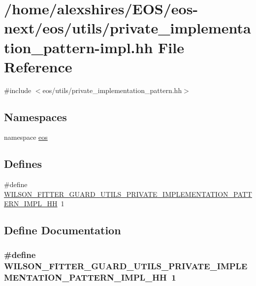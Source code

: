 \hypertarget{private__implementation__pattern-impl_8hh}{
\section{/home/alexshires/EOS/eos-\/next/eos/utils/private\_\-implementation\_\-pattern-\/impl.hh File Reference}
\label{private__implementation__pattern-impl_8hh}
}
{\ttfamily \#include $<$eos/utils/private\_\-implementation\_\-pattern.hh$>$}\par
\subsection*{Namespaces}
\begin{DoxyCompactItemize}
\item 
namespace \hyperlink{namespaceeos}{eos}
\end{DoxyCompactItemize}
\subsection*{Defines}
\begin{DoxyCompactItemize}
\item 
\#define \hyperlink{private__implementation__pattern-impl_8hh_a0be835b85f475d253071ae9037d99520}{WILSON\_\-FITTER\_\-GUARD\_\-UTILS\_\-PRIVATE\_\-IMPLEMENTATION\_\-PATTERN\_\-IMPL\_\-HH}~1
\end{DoxyCompactItemize}


\subsection{Define Documentation}
\hypertarget{private__implementation__pattern-impl_8hh_a0be835b85f475d253071ae9037d99520}{
\subsubsection[{WILSON\_\-FITTER\_\-GUARD\_\-UTILS\_\-PRIVATE\_\-IMPLEMENTATION\_\-PATTERN\_\-IMPL\_\-HH}]{\setlength{\rightskip}{0pt plus 5cm}\#define WILSON\_\-FITTER\_\-GUARD\_\-UTILS\_\-PRIVATE\_\-IMPLEMENTATION\_\-PATTERN\_\-IMPL\_\-HH~1}}
\label{private__implementation__pattern-impl_8hh_a0be835b85f475d253071ae9037d99520}
